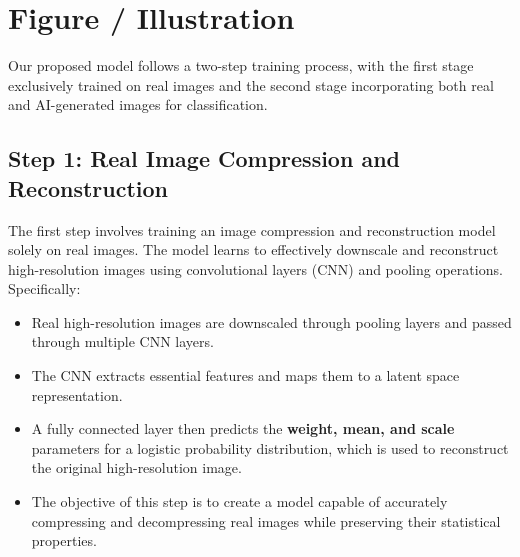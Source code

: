 \documentclass{article} %
\begin{document}
\section{Figure / Illustration}
\label{illustration}

Our proposed model follows a two-step training process, with the first stage exclusively trained on real images and the second stage incorporating both real and AI-generated images for classification.

\subsection{Step 1: Real Image Compression and Reconstruction}
The first step involves training an image compression and reconstruction model solely on real images. The model learns to effectively downscale and reconstruct high-resolution images using convolutional layers (CNN) and pooling operations. Specifically:
\begin{itemize}
    \item Real high-resolution images are downscaled through pooling layers and passed through multiple CNN layers.
    \item The CNN extracts essential features and maps them to a latent space representation.
    \item A fully connected layer then predicts the \textbf{weight, mean, and scale} parameters for a logistic probability distribution, which is used to reconstruct the original high-resolution image.
    \item The objective of this step is to create a model capable of accurately compressing and decompressing real images while preserving their statistical properties.
\end{itemize}
\end{document}
